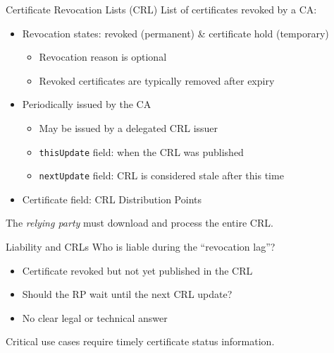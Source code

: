 \begin{frame}{Certificate Revocation Lists (CRL)}
  List of certificates revoked by a CA:
  \begin{itemize}[<+(1)->]
    \item Revocation states: revoked (permanent) \& certificate hold (temporary)
    \begin{itemize}
      \item Revocation reason is optional
      \item Revoked certificates are typically removed after expiry
    \end{itemize}
    \item Periodically issued by the CA
    \begin{itemize}
      \item May be issued by a delegated CRL issuer
      \item \texttt{thisUpdate} field: when the CRL was published
      \item \texttt{nextUpdate} field: CRL is considered stale after this time
    \end{itemize}
    \item Certificate field: CRL Distribution Points
  \end{itemize}

  \pause
  The \emph{relying party} must download and process the entire CRL.
\end{frame}

\begin{frame}{Liability and CRLs}
  \pause
  Who is liable during the \enquote{revocation lag}?
  \begin{itemize}[<+(1)->]
    \item Certificate revoked but not yet published in the CRL
    \item Should the RP wait until the next CRL update?
    \item No clear legal or technical answer
  \end{itemize}

  \pause
  Critical use cases require timely certificate status information.
\end{frame}


